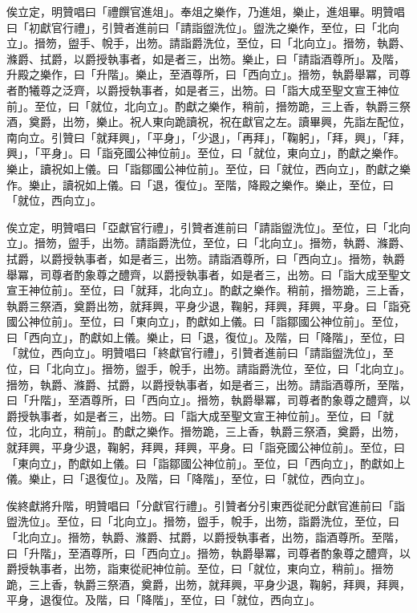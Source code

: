 \begin{pinyinscope}
 俟立定，明贊唱曰「禮饌官進俎」。奉俎之樂作，乃進俎，樂止，進俎畢。明贊唱曰「初獻官行禮」，引贊者進前曰「請詣盥洗位」。盥洗之樂作，至位，曰「北向立」。搢笏，盥手、帨手，出笏。請詣爵洗位，至位，曰「北向立」。搢笏，執爵、滌爵、拭爵，以爵授執事者，如是者三，出笏。樂止，曰「請詣酒尊所」。及階，升殿之樂作，曰「升階」。樂止，至酒尊所，曰「西向立」。搢笏，執爵舉冪，司尊者酌犧尊之泛齊，以爵授執事者，如是者三，出笏。曰「詣大成至聖文宣王神位前」。至位，曰「就位，北向立」。酌獻之樂作，稍前，搢笏跪，三上香，執爵三祭酒，奠爵，出笏，樂止。祝人東向跪讀祝，祝在獻官之左。讀畢興，先詣左配位，南向立。引贊曰「就拜興」，「平身」，「少退」，「再拜」，「鞠躬」，「拜，興」，「拜，興」，「平身」。曰「詣兗國公神位前」。至位，曰「就位，東向立」，酌獻之樂作。樂止，讀祝如上儀。曰「詣鄒國公神位前」。至位，曰「就位，西向立」，酌獻之樂作。樂止，讀祝如上儀。曰「退，復位」。至階，降殿之樂作。樂止，至位，曰「就位，西向立」。



 俟立定，明贊唱曰「亞獻官行禮」，引贊者進前曰「請詣盥洗位」。至位，曰「北向立」。搢笏，盥手，出笏。請詣爵洗位，至位，曰「北向立」。搢笏，執爵、滌爵、拭爵，以爵授執事者，如是者三，出笏。請詣酒尊所，曰「西向立」。搢笏，執爵舉冪，司尊者酌象尊之醴齊，以爵授執事者，如是者三，出笏。曰「詣大成至聖文宣王神位前」。至位，曰「就拜，北向立」。酌獻之樂作。稍前，搢笏跪，三上香，執爵三祭酒，奠爵出笏，就拜興，平身少退，鞠躬，拜興，拜興，平身。曰「詣兗國公神位前」。至位，曰「東向立」，酌獻如上儀。曰「詣鄒國公神位前」。至位，曰「西向立」，酌獻如上儀。樂止，曰「退，復位」。及階，曰「降階」，至位，曰「就位，西向立」。明贊唱曰「終獻官行禮」，引贊者進前曰「請詣盥洗位」，至位，曰「北向立」。搢笏，盥手，帨手，出笏。請詣爵洗位，至位，曰「北向立」。搢笏，執爵、滌爵、拭爵，以爵授執事者，如是者三，出笏。請詣酒尊所，至階，曰「升階」，至酒尊所，曰「西向立」。搢笏，執爵舉冪，司尊者酌象尊之醴齊，以爵授執事者，如是者三，出笏。曰「詣大成至聖文宣王神位前」。至位，曰「就位，北向立，稍前」。酌獻之樂作。搢笏跪，三上香，執爵三祭酒，奠爵，出笏，就拜興，平身少退，鞠躬，拜興，拜興，平身。曰「詣兗國公神位前」。至位，曰「東向立」，酌獻如上儀。曰「詣鄒國公神位前」。至位，曰「西向立」，酌獻如上儀。樂止，曰「退復位」。及階，曰「降階」，至位，曰「就位，西向立」。



 俟終獻將升階，明贊唱曰「分獻官行禮」。引贊者分引東西從祀分獻官進前曰「詣盥洗位」。至位，曰「北向立」。搢笏，盥手，帨手，出笏，詣爵洗位，至位，曰「北向立」。搢笏，執爵、滌爵、拭爵，以爵授執事者，出笏，詣酒尊所。至階，曰「升階」，至酒尊所，曰「西向立」。搢笏，執爵舉冪，司尊者酌象尊之醴齊，以爵授執事者，出笏，詣東從祀神位前。至位，曰「就位，東向立，稍前」。搢笏跪，三上香，執爵三祭酒，奠爵，出笏，就拜興，平身少退，鞠躬，拜興，拜興，平身，退復位。及階，曰「降階」，至位，曰「就位，西向立」。




\end{pinyinscope}
